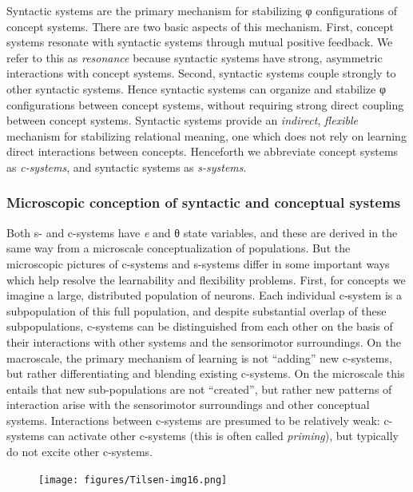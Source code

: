 Syntactic systems are the primary mechanism for stabilizing φ configurations of concept systems. There are two basic aspects of this mechanism. First, concept systems resonate with syntactic systems through mutual positive feedback. We refer to this as \textit{resonance} because syntactic systems have strong, asymmetric interactions with concept systems. Second, syntactic systems couple strongly to other syntactic systems. Hence syntactic systems can organize and stabilize φ configurations between concept systems, without requiring strong direct coupling between concept systems. Syntactic systems provide an \textit{indirect}, \textit{flexible} mechanism for stabilizing relational meaning, one which does not rely on learning direct interactions between concepts. Henceforth we abbreviate concept systems as \textit{c-systems}, and syntactic systems as \textit{s-systems}. 

\subsubsection{Microscopic conception of syntactic and conceptual systems}

Both s- and c-systems have \textit{e} and θ state variables, and these are derived in the same way from a microscale conceptualization of populations. But the microscopic pictures of c-systems and s-systems differ in some important ways which help resolve the learnability and flexibility problems. First, for concepts we imagine a large, distributed population of neurons. Each individual c-system is a subpopulation of this full population, and despite substantial overlap of these subpopulations, c-systems can be distinguished from each other on the basis of their interactions with other systems and the sensorimotor surroundings. On the macroscale, the primary mechanism of learning is not “adding” new c-systems, but rather differentiating and blending existing c-systems. On the microscale this entails that new sub-populations are not “created”, but rather new patterns of interaction arise with the sensorimotor surroundings and other conceptual systems. Interactions between c-systems are presumed to be relatively weak: c-systems can activate other c-systems (this is often called \textit{priming}), but typically do not excite other c-systems.

  
\begin{figure}
\texttt{[image: figures/Tilsen-img16.png]}
\caption{\missingcaption}
\label{fig:}
\end{figure}
 

